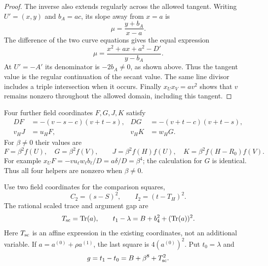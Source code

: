 \documentclass[11pt,a4paper]{article}
\DeclareMathOperator{\Tr}{Tr}\DeclareMathOperator{\Nm}{Nm}
\begin{document}
\begin{proof}
The inverse also extends regularly across the allowed tangent.
Writing $U'=(x,y)$ and $b_A=ac$, its slope away from $x=a$ is
\[
                         \mu=\frac{y+b_A}{x-a}.
\]
The difference of the two curve equations gives the equal expression
\[
              \mu=\frac{x^2+ax+a^2-D'}{y-b_A}.
\]
At $U'=-A'$ its denominator is $-2b_A\ne0$, as shown above.
Thus the tangent value is the regular continuation of the secant
value. The same line divisor includes a triple intersection when
it occurs. Finally $x_Ux_V=av^2$ shows that $v$ remains nonzero
throughout the allowed domain, including this tangent.
\end{proof}

Four further field coordinates $F,G,J,K$ satisfy
\begin{equation}\label{eq:helpers}
\begin{aligned}
 DF&=-(v-s-c)(v+t-s),& DG&=-(v+t-c)(v+t-s),\\
 v_HJ&=u_HF,& v_HK&=w_HG.
\end{aligned}
\end{equation}
For $\beta\ne0$ their values are
\begin{equation}\label{eq:helpervalues}
 F=\beta^2f(U),\quad G=\beta^2f(V),\qquad
 J=\beta^2f(H)f(U),\quad K=\beta^2f(H-R_0)f(V).
\end{equation}
For example $x_UF=-v u_\ell w_\ell b_\ell/D=a\delta/D=\beta^4$;
the calculation for $G$ is identical. Thus all four helpers are
nonzero when $\beta\ne0$.

Use two field coordinates for the comparison squares,
\begin{equation}\label{eq:comparisons}
                         C_2=(s-S)^2,\qquad I_2=(t-T_H)^2.
\end{equation}
The rational scaled trace and argument gap are
\begin{equation}\label{eq:gap}
 T_{\rm sc}=\Tr(a),\qquad
 t_1-\lambda=B+b_4^2+(\Tr(a))^2.
\end{equation}
Here $T_{\rm sc}$ is an affine expression in the existing coordinates,
not an additional variable. If $a=a^{(0)}+\rho a^{(1)}$, the last
square is $4(a^{(0)})^2$. Put $t_0=\lambda$ and
\[
                    g=t_1-t_0=B+\beta^8+T_{\rm sc}^2.
\]
\end{document}
